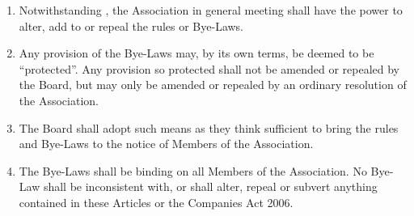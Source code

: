 \documentclass[10pt]{mk-articles-of-association}
\newcommand{\EC}[0]{Board}
\newcommand{\Exec}[0]{\EC{} }
\newcommand{\LAFA}[0]{Leasehold and Freehold Abuses}
\begin{document}
\begin{enumerate}
\begin{enumerate}

\item the admission of Members of the Association (including the admission
  of organisations to Membership) and the rights and privileges of
  such Members, and the entrance fees, subscriptions and other fees or
  payments to be made by Members;

\item the arrangements for the election or appointment of members of
  the \Exec by any Councils pursuant to
  ;

\item the conduct of Members of the Association in relation to one
  another, and to the Association's employees and volunteers;

\item the procedure at general meetings and meetings of the \Exec and
  the Councils in so far as such procedure is not regulated by the
  Companies Act or by these Articles;

\item the format and contents of the Register of \LAFA, such that
  it shall provide a general means of enumerating, identifying and
  discussing \LAFA{} both within and outside the Association; \ITand

\item generally, all such matters as are commonly the subject matter
  of company rules.

\end{enumerate}

\item Notwithstanding , the Association in
  general meeting shall have the power to alter, add to or repeal the
  rules or Bye-Laws.

\item Any provision of the Bye-Laws may, by its own terms, be deemed
  to be ``protected''. Any provision so protected shall not be amended
  or repealed by the Board, but may only be amended or repealed by an
  ordinary resolution of the Association.

\item The \Exec shall adopt such means as they think sufficient to
  bring the rules and Bye-Laws to the notice of Members of the Association.

\item The Bye-Laws shall be binding on all Members of the
  Association. No Bye-Law shall be inconsistent with, or shall
  alter, repeal or subvert anything contained in these Articles or
  the Companies Act 2006.



\end{enumerate}
\end{document}
